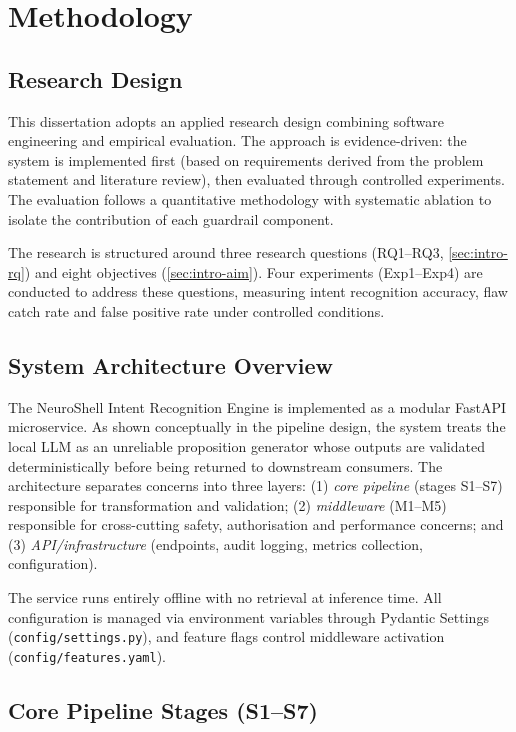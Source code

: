 \chapter{Methodology}\label{ch:methodology}

\section{Research Design}\label{sec:method-design}

This dissertation adopts an applied research design combining software engineering and empirical evaluation. The approach is evidence-driven: the system is implemented first (based on requirements derived from the problem statement and literature review), then evaluated through controlled experiments. The evaluation follows a quantitative methodology with systematic ablation to isolate the contribution of each guardrail component.

The research is structured around three research questions (RQ1--RQ3, \cref{sec:intro-rq}) and eight objectives (\cref{sec:intro-aim}). Four experiments (Exp1--Exp4) are conducted to address these questions, measuring intent recognition accuracy, flaw catch rate and false positive rate under controlled conditions.

\section{System Architecture Overview}\label{sec:method-arch}

The NeuroShell Intent Recognition Engine is implemented as a modular FastAPI microservice. As shown conceptually in the pipeline design, the system treats the local LLM as an unreliable proposition generator whose outputs are validated deterministically before being returned to downstream consumers. The architecture separates concerns into three layers: (1) \textit{core pipeline} (stages S1--S7) responsible for transformation and validation; (2) \textit{middleware} (M1--M5) responsible for cross-cutting safety, authorisation and performance concerns; and (3) \textit{API/infrastructure} (endpoints, audit logging, metrics collection, configuration).

The service runs entirely offline with no retrieval at inference time. All configuration is managed via environment variables through Pydantic Settings (\texttt{config/settings.py}), and feature flags control middleware activation (\texttt{config/features.yaml}).

\section{Core Pipeline Stages (S1--S7)}\label{sec:method-pipeline}


